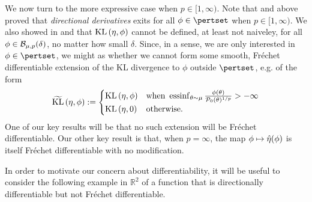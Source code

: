 We now turn to the more expressive case when $p \in [1, \infty)$. Note that
 and  above proved that {\em
directional derivatives} exits for all $\phi \in \pertset$ when $p \in [1,
\infty)$.  We also showed in  and 
that $\mathrm{KL}\left(\eta, \phi\right)$ cannot be defined, at least not naiveley, for all $\phi
\in \mathcal{B}_{\mu,p}(\delta)$, no matter how small $\delta$. Since, in a sense, we
are only interested in $\phi \in \pertset$, we might as whether we cannot form
some smooth, Fr{\'e}chet differentiable extension of the KL divergence to $\phi$
outside $\pertset$, e.g. of the form
%
\begin{align*}
%
\KLhat{\eta, \phi} :=
\begin{cases}
    \KL{\eta, \phi} & \textrm{when }\essinf_{\theta \sim \mu}
        \frac{\phi(\theta)}{\pbase(\theta)^{1/p}} > -\infty\\
    \KL{\eta, \phiz} & \textrm{otherwise}.
\end{cases}
%
\end{align*}
%
One of our key results will be that no such extension will be Fr{\'e}chet
differentiable.  Our other key result is that, when $p=\infty$, the map $\phi
\mapsto \hat\eta(\phi)$ is itself Fr{\'e}chet differentiable with no
modification.

In order to motivate our concern about differentiability, it will be useful to
consider the following example in $\mathbb{R}^2$ of a function that is
directionally differentiable but not Fr{\'e}chet differentiable.

